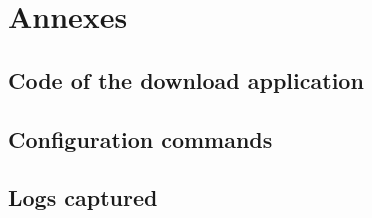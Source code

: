 \documentclass[a4paper,11pt,english]{article}
\begin{document}
\newpage
\section{Annexes}
    \subsection{Code of the download application}

        
        
        
        
        
        
        
        
        
        
        

    \subsection{Configuration commands}

    \subsection{Logs captured}
\end{document}
